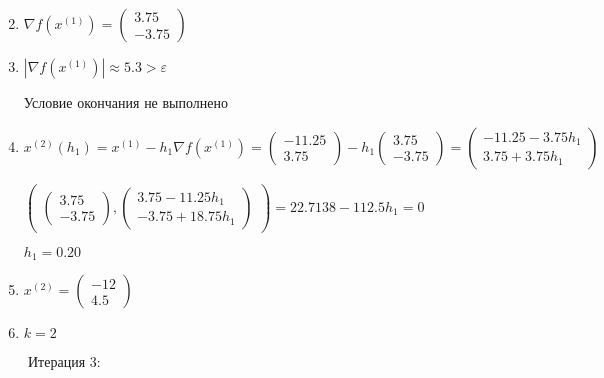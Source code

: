 \documentclass{article}
\begin{document}
\begin{enumerate}
    \setcounter{enumi}{1}
    \item $\nabla f(x^{(1)}) = \begin{pmatrix} 3.75 \\ -3.75 \end{pmatrix}$
    \item $|\nabla f(x^{(1)})| \approx 5.3 > \varepsilon$
    
        Условие окончания не выполнено
    \item $x^{(2)}(h_{1}) = x^{(1)} - h_{1}\nabla f(x^{(1)}) =
        \begin{pmatrix} -11.25 \\ 3.75 \end{pmatrix} - h_{1}
        \begin{pmatrix} 3.75 \\ -3.75 \end{pmatrix} =
        \begin{pmatrix} -11.25 - 3.75h_{1} \\ 3.75 + 3.75h_{1} \end{pmatrix}$
        
        
        $\begin{pmatrix}
            \begin{pmatrix} 3.75 \\ -3.75 \end{pmatrix},
            \begin{pmatrix} 3.75 - 11.25h_{1} \\ -3.75 + 18.75h_{1} \end{pmatrix}
        \end{pmatrix} = 22.7138 - 112.5h_{1} = 0$
        
        
        $h_{1} = 0.20$
    \item $x^{(2)} = \begin{pmatrix} -12 \\ 4.5 \end{pmatrix}$
    \item $k = 2$
\end{enumerate}

\ \ \ \ Итерация 3:
\end{document}
